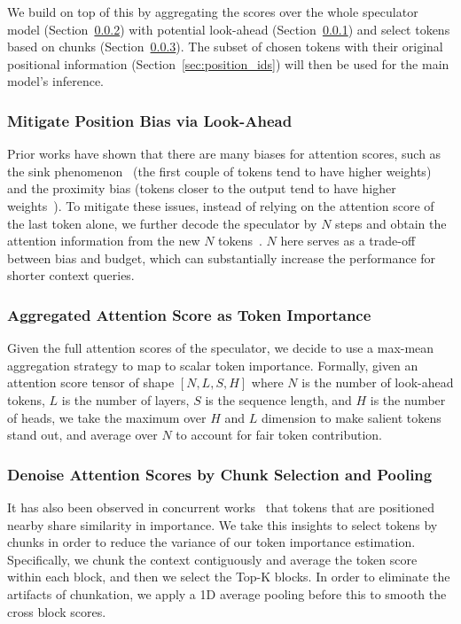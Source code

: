 We build on top of this by aggregating the scores over the whole speculator model (Section~\ref{sec:attn_agg}) with potential look-ahead (Section~\ref{sec:look_ahead}) and select tokens based on chunks (Section~\ref{sec:chunk_select}). The subset of chosen tokens with their original positional information (Section~\ref{sec:position_ids}) will then be used for the main model's inference. 

\subsubsection{Mitigate Position Bias via Look-Ahead}
\label{sec:look_ahead}
Prior works have shown that there are many biases for attention scores, such as the sink phenomenon~\cite{xiao2024efficientstreaminglanguagemodels} (the first couple of tokens tend to have higher weights) and the proximity bias (tokens closer to the output tend to have higher weights~\cite{lv2024critiprefillsegmentwisecriticalitybasedapproach}). To mitigate these issues, instead of relying on the attention score of the last token alone, we further decode the speculator by $N$ steps and obtain the attention information from the new $N$ tokens~\cite{wan2024lookmlookonceoptimizationkv}. $N$ here serves as a trade-off between bias and budget, which can substantially increase the performance for shorter context queries. 

\subsubsection{Aggregated Attention Score as Token Importance}
\label{sec:attn_agg}
Given the full attention scores of the speculator, we decide to use a max-mean aggregation strategy to map to scalar token importance. Formally, given an attention score tensor of shape $[N, L, S, H]$ where $N$ is the number of look-ahead tokens, $L$ is the number of layers, $S$ is the sequence length, and $H$ is the number of heads, we take the maximum over $H$ and $L$ dimension to make salient tokens stand out, and average over $N$ to account for fair token contribution. 

\subsubsection{Denoise Attention Scores by Chunk Selection and Pooling}
\label{sec:chunk_select}
It has also been observed in concurrent works~\cite{lv2024critiprefillsegmentwisecriticalitybasedapproach} that tokens that are positioned nearby share similarity in importance. We take this insights to select tokens by chunks in order to reduce the variance of our token importance estimation. Specifically, we chunk the context contiguously and average the token score within each block, and then we select the Top-K blocks. In order to eliminate the artifacts of chunkation, we apply a 1D average pooling before this to smooth the cross block scores. 


